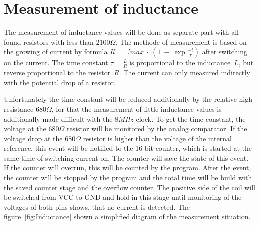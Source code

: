 \section{Measurement of inductance}
The measurement of inductance values will be done as separate part with all found resistors with
less than \(2100\Omega\).
The methode of measurement is based on the growing of current by formula \(Il~=~Imax~\cdot~(1~-~\exp{\frac{-t}{\tau}})\) 
after switching on the current.
The time constant \(\tau = \frac{L}{R}\) is proportional to the inductance~\(L\), but reverse proportional to the
resistor~\(R\). 
The current can only measured indirectly with the potential drop of a resistor.

Unfortunately the time constant will be reduced additionally by the relative high resistance \(680\Omega\),
for that the measurement of little inductance values is additionally made difficult with the \(8MHz\) clock.
To get the time constant, the voltage at the \(680\Omega\) resistor will be monitored by the analog
comparator.
If the voltage drop at the \(680\Omega\) resistor is higher than the voltage of the internal reference, this
event will be notified to the 16-bit counter, which is started at the same time of switching current on.
The counter will save the state of this event.
If the counter will overrun, this will be counted by the program.
After the event, the counter will be stopped by the program and the total time will be build with the saved
counter stage and the overflow counter.
The positive side of the coil will be switched from VCC to GND and hold in this stage until  monitoring 
of the voltages of both pins shows, that no current is detected.
The figure~\ref{fig:Inductance} shown a simplified diagram of the measurement situation.

